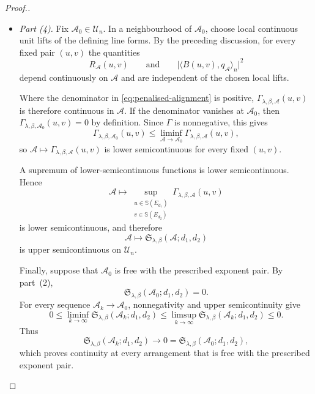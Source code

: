 \documentclass[10pt,a4paper]{amsart}
\begin{document}
\begin{proof}[Proof.]
\begin{itemize}
\item \emph{Part (4).}
Fix $\mathcal{A}_0\in\mathcal U_n$. In a neighbourhood of $\mathcal{A}_0$,
choose local continuous unit lifts of the defining line forms. By the
preceding discussion, for every fixed pair $(u,v)$ the quantities
\[
R_{\mathcal{A}}(u,v)
\qquad\text{and}\qquad
\bigl|\langle B(u,v),q_{\mathcal{A}}\rangle_n\bigr|^2
\]
depend continuously on $\mathcal{A}$ and are independent of the chosen local
lifts.

Where the denominator in \eqref{eq:penalised-alignment} is positive,
$\Gamma_{\lambda,\beta,\mathcal{A}}(u,v)$ is therefore continuous in
$\mathcal{A}$. If the denominator vanishes at $\mathcal{A}_0$, then
$\Gamma_{\lambda,\beta,\mathcal{A}_0}(u,v)=0$ by definition. Since $\Gamma$ is
nonnegative, this gives
\[
\Gamma_{\lambda,\beta,\mathcal{A}_0}(u,v)
\leq
\liminf_{\mathcal{A}\to\mathcal{A}_0}
\Gamma_{\lambda,\beta,\mathcal{A}}(u,v),
\]
so $\mathcal{A}\mapsto
\Gamma_{\lambda,\beta,\mathcal{A}}(u,v)$ is lower semicontinuous for every
fixed $(u,v)$.

A supremum of lower-semicontinuous functions is lower semicontinuous. Hence
\[
\mathcal{A}
\longmapsto
\sup_{\substack{u\in\mathbb S(E_{d_1})\\
v\in\mathbb S(E_{d_2})}}
\Gamma_{\lambda,\beta,\mathcal{A}}(u,v)
\]
is lower semicontinuous, and therefore
\[
\mathcal{A}
\longmapsto
\mathfrak S_{\lambda,\beta}(\mathcal{A};d_1,d_2)
\]
is upper semicontinuous on $\mathcal U_n$.

Finally, suppose that $\mathcal{A}_0$ is free with the prescribed exponent
pair. By part~(2),
\[
\mathfrak S_{\lambda,\beta}(\mathcal{A}_0;d_1,d_2)=0.
\]
For every sequence $\mathcal{A}_k\to\mathcal{A}_0$, nonnegativity and upper
semicontinuity give
\[
0
\leq
\liminf_{k\to\infty}
\mathfrak S_{\lambda,\beta}(\mathcal{A}_k;d_1,d_2)
\leq
\limsup_{k\to\infty}
\mathfrak S_{\lambda,\beta}(\mathcal{A}_k;d_1,d_2)
\leq0.
\]
Thus
\[
\mathfrak S_{\lambda,\beta}(\mathcal{A}_k;d_1,d_2)
\longrightarrow0
=
\mathfrak S_{\lambda,\beta}(\mathcal{A}_0;d_1,d_2),
\]
which proves continuity at every arrangement that is free with the prescribed
exponent pair.


\end{itemize}
\end{proof}
\end{document}
